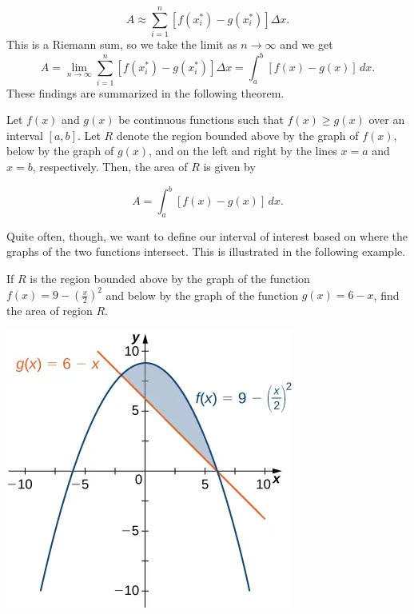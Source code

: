 \documentclass{report}
\begin{document}
    \[
    A \approx \sum_{i=1}^{n} \left[ f(x^*_i) - g(x^*_i) \right] \Delta x.
    \]
    \bigbreak \noindent 
    This is a Riemann sum, so we take the limit as \( n \to \infty \) and we get
    \[
    A = \lim_{{n \to \infty}} \sum_{i=1}^{n} \left[ f(x^*_i) - g(x^*_i) \right] \Delta x = \int_{a}^{b} \left[ f(x) - g(x) \right] \, dx.
    \]
    \bigbreak \noindent 
    These findings are summarized in the following theorem.
    \bigbreak \noindent 
    \begin{thrm}
       Let \( f(x) \) and \( g(x) \) be continuous functions such that \( f(x) \geq g(x) \) over an interval \([a, b]\).
Let \( R \) denote the region bounded above by the graph of \( f(x) \), below by the graph of \( g(x) \), and on the left and right by the lines \( x = a \) and \( x = b \), respectively. Then, the area of \( R \) is given by

    \[
    A = \int_{a}^{b} \left[ f(x) - g(x) \right] \, dx.
    \] 
    \end{thrm}
    \bigbreak \noindent 
    Quite often, though, we want to define our interval of interest based on where the graphs of the two functions intersect. This is illustrated in the following example.
    \bigbreak \noindent 
    \begin{eg}
       If \( R \) is the region bounded above by the graph of the function \( f(x) = 9 - \left( \frac{x}{2} \right)^2 \) and below by the graph of the function \( g(x) = 6 - x \), find the area of region \( R \).
    \end{eg}
    \bigbreak \noindent \bigbreak \noindent 
    \begin{minipage}{0.47\textwidth}
    \begin{center}
        \includegraphics[scale=.35]{ ./figures/graph3.png}
    \end{center}
    \end{minipage}
\end{document}
